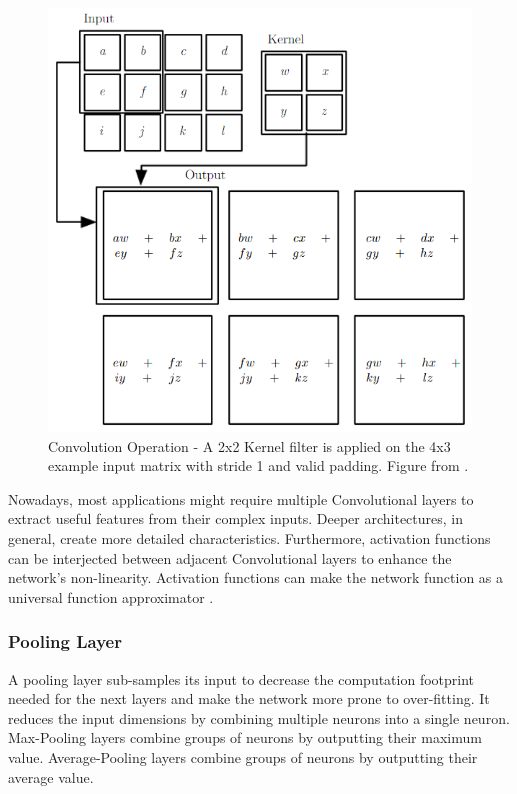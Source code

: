 \begin{figure} [H]
	\centering
	\includegraphics[scale=0.6]{Images/CNNArchitectures/convolution-operation.png}
	\decoRule
	\caption[Convolution Operation]{Convolution Operation - A 2x2 Kernel filter is applied on the 4x3 example input matrix with stride 1 and valid padding. Figure from \cite{Goodfellow-et-al-2016}.}
	\label{fig:convolution-operation}
\end{figure}

Nowadays, most applications might require multiple Convolutional layers to extract useful features from their complex inputs. Deeper architectures, in general, create more detailed characteristics. Furthermore, activation functions can be interjected between adjacent Convolutional layers to enhance the network's non-linearity. Activation functions can make the network function as a universal function approximator \cite{Approximation-capabilities-of-multilayer-feedforward-networks}.

\subsubsection{Pooling Layer}
A pooling layer sub-samples its input to decrease the computation footprint needed for the next layers and make the network more prone to over-fitting. It reduces the input dimensions by combining multiple neurons into a single neuron. Max-Pooling layers combine groups of neurons by outputting their maximum value. Average-Pooling layers combine groups of neurons by outputting their average value.

